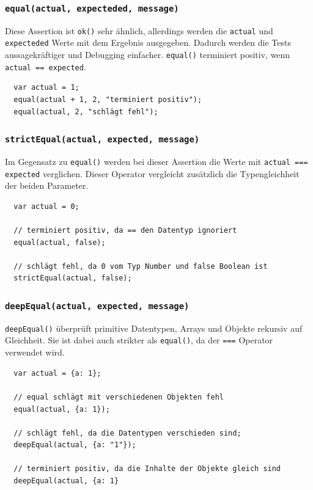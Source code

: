 \documentclass[11pt, a4paper]{article}
\begin{document}
\subsubsection*{\texttt{equal(actual, expecteded, message)}}

Diese Assertion ist \texttt{ok()} sehr ähnlich, allerdings werden die
\texttt{actual} und \texttt{expecteded} Werte mit dem Ergebnis ausgegeben. Dadurch
werden die Tests aussagekräftiger und Debugging einfacher. \texttt{equal()}
terminiert positiv, wenn \texttt{actual == expected}. 

\begin{verbatim}
  var actual = 1;
  equal(actual + 1, 2, "terminiert positiv");
  equal(actual, 2, "schlägt fehl");
\end{verbatim}

\subsubsection*{\texttt{strictEqual(actual, expected, message)}}

Im Gegensatz zu \texttt{equal()} werden bei dieser Assertion die Werte
mit \texttt{actual === expected} verglichen. Dieser Operator vergleicht
zusätzlich die Typengleichheit der beiden Parameter.

\begin{verbatim}
  var actual = 0;

  // terminiert positiv, da == den Datentyp ignoriert
  equal(actual, false);

  // schlägt fehl, da 0 vom Typ Number und false Boolean ist
  strictEqual(actual, false);
\end{verbatim}

\subsubsection*{\texttt{deepEqual(actual, expected, message)}}

\texttt{deepEqual()} überprüft primitive Datentypen, Arrays und Objekte
rekursiv auf Gleichheit. Sie ist dabei auch strikter als \texttt{equal()}, da
der \texttt{===} Operator verwendet wird.

\begin{verbatim}
  var actual = {a: 1};

  // equal schlägt mit verschiedenen Objekten fehl
  equal(actual, {a: 1});

  // schlägt fehl, da die Datentypen verschieden sind;
  deepEqual(actual, {a: "1"});

  // terminiert positiv, da die Inhalte der Objekte gleich sind
  deepEqual(actual, {a: 1}
\end{verbatim}
\end{document}
